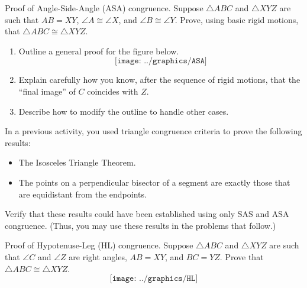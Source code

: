 \begin{prob}
Proof of Angle-Side-Angle (ASA) congruence.  Suppose $\triangle ABC$ and $\triangle XYZ$ are such that $AB=XY$, $\angle A \cong \angle X$, and $\angle B \cong \angle Y$.  Prove, using basic rigid motions, that $\triangle ABC \cong \triangle XYZ$.  
\begin{enumerate}
\item Outline a general proof for the figure below.  
$$\texttt{[image: ../graphics/ASA]}$$
\item Explain carefully how you know, after the sequence of rigid motions, that the ``final image'' of $C$ coincides with $Z$.  
\item Describe how to modify the outline to handle other cases. 
\end{enumerate}
\end{prob}


\begin{prob}
In a previous activity, you used triangle congruence criteria to prove the following results: 
\begin{itemize}
\item The Isosceles Triangle Theorem.
\item The points on a perpendicular bisector of a segment are exactly those that are equidistant from the endpoints.
\end{itemize}
Verify that these results could have been established using only SAS and ASA congruence.  (Thus, you may use these results in the problems that follow.) 
\end{prob}

\begin{prob}
Proof of Hypotenuse-Leg (HL) congruence.  Suppose $\triangle ABC$ and $\triangle XYZ$ are such that $\angle C$ and $\angle Z$ are right angles, $AB=XY$, and $BC=YZ$.  Prove that $\triangle ABC \cong \triangle XYZ$.  
$$\texttt{[image: ../graphics/HL]}$$
\end{prob}


